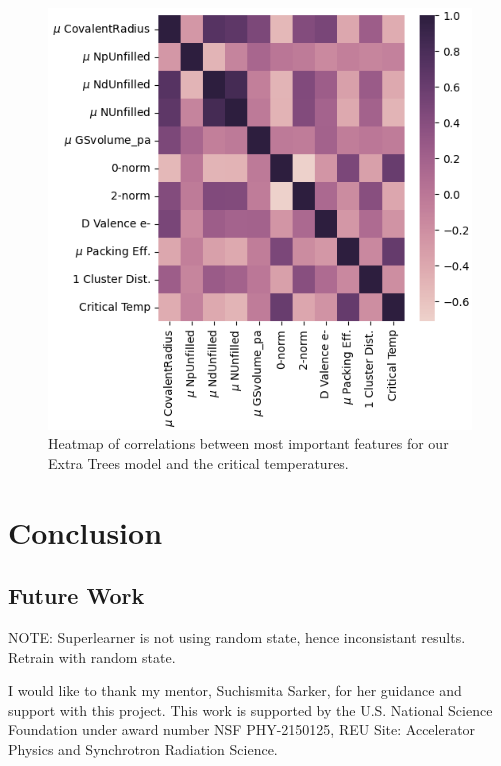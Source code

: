 \documentclass[twocolumn, nofootinbib, secnumarabic, amssymb, nobibnotes, aps, prd]{revtex4-2}
\begin{document}
\begin{figure}[!h] %
   \centering
   \includegraphics[width=\columnwidth]{images/feature_heatmap_eti.png}
   \caption{Heatmap of correlations between most important features for our Extra Trees model and the critical temperatures.}
\end{figure}\label{fig:feature-correlations}

\section{Conclusion}
\subsection{Future Work}

NOTE: Superlearner is not using random state, hence inconsistant results. Retrain with random state.

\begin{acknowledgments}
I would like to thank my mentor, Suchismita Sarker, for her guidance and support with this project. This work is supported by the U.S. National Science Foundation under award number NSF PHY-2150125, REU Site: Accelerator Physics and Synchrotron Radiation Science.
\end{acknowledgments}



\end{document}
